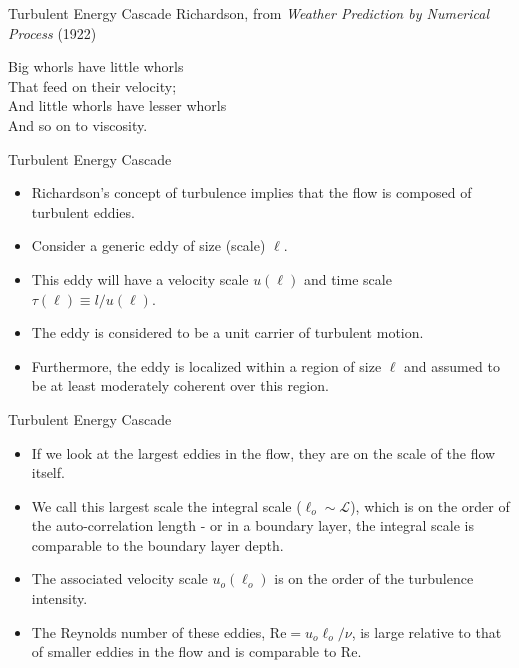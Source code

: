 
\begin{frame}{Turbulent Energy Cascade}
	Richardson, from \emph{Weather Prediction by Numerical Process} (1922)
	\begin{fancyquotes}
		Big whorls have little whorls\\
		That feed on their velocity;\\
		And little whorls have lesser whorls\\
		And so on to viscosity.
	\end{fancyquotes}
\end{frame}

\begin{frame}{Turbulent Energy Cascade}
\begin{itemize}
	\item Richardson's concept of turbulence implies that the flow is composed of turbulent eddies.
	\item Consider a generic eddy of size (scale) $\ell$.
	\item This eddy will have a velocity scale $u(\ell)$ and time scale $\tau (\ell) \equiv l / u(\ell)$.
	\item The eddy is considered to be a unit carrier of turbulent motion.
	\item Furthermore, the eddy is localized within a region of size $\ell$ and assumed to be at least moderately coherent over this region.
\end{itemize}
\end{frame}

\begin{frame}{Turbulent Energy Cascade}
\begin{itemize}
	\item If we look at the largest eddies in the flow, they are on the scale of the flow itself.
	\item We call this largest scale the integral scale ($\ell_o \sim \mathcal{L}$), which is on the order of the auto-correlation length - or in a boundary layer, the integral scale is comparable to the boundary layer depth.
	\item The associated velocity scale $u_o(\ell_o)$ is on the order of the turbulence intensity.
	\item The Reynolds number of these eddies, Re$=u_o \ell_o/\nu$, is large relative to that of smaller eddies in the flow and is comparable to Re.	
\end{itemize}
\end{frame}


